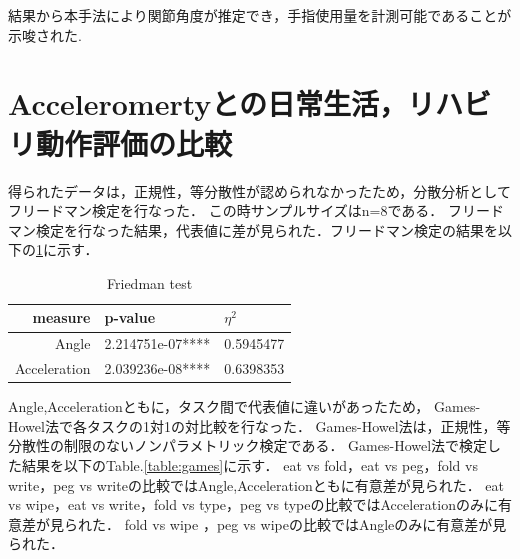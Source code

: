 結果から本手法により関節角度が推定でき，手指使用量を計測可能であることが示唆された.


\section{Acceleromertyとの日常生活，リハビリ動作評価の比較}

得られたデータは，正規性，等分散性が認められなかったため，分散分析としてフリードマン検定を行なった．
この時サンプルサイズはn=8である．
フリードマン検定を行なった結果，代表値に差が見られた．フリードマン検定の結果を以下の\ref{table:friedman}に示す．

\begin{table}[H]
  \caption{Friedman test}
  \label{table:friedman}
  \centering
  \begin{tabular}{rll}
    \hline 
measure &  p-value  & $\eta^2$\\
    \hline \hline
Angle     & 2.214751e-07****&0.5945477\\
Acceleration  & 2.039236e-08****&0.6398353\\

    \hline
  \end{tabular}
\end{table}

Angle,Accelerationともに，タスク間で代表値に違いがあったため，
Games-Howel法で各タスクの1対1の対比較を行なった．
Games-Howel法は，正規性，等分散性の制限のないノンパラメトリック検定である．
Games-Howel法で検定した結果を以下のTable.\ref{table:games}に示す．
eat vs fold，eat vs peg，fold vs write，peg vs writeの比較ではAngle,Accelerationともに有意差が見られた．
eat vs wipe，eat vs write，fold vs type，peg vs typeの比較ではAccelerationのみに有意差が見られた．
fold vs wipe ，peg vs wipeの比較ではAngleのみに有意差が見られた．

